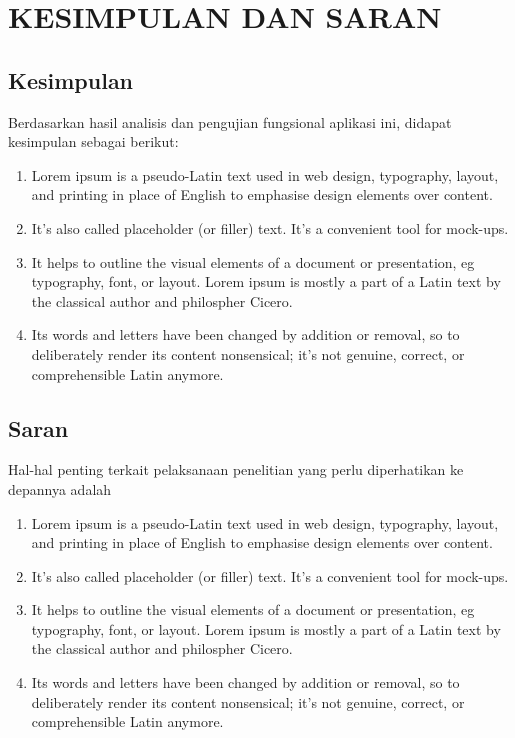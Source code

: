 \chapter{KESIMPULAN DAN SARAN}

\section{Kesimpulan}
Berdasarkan hasil analisis dan pengujian fungsional aplikasi ini, didapat kesimpulan sebagai berikut:

\begin{enumerate}
	\item Lorem ipsum is a pseudo-Latin text used in web design, typography, layout, and printing in place of English to emphasise design elements over content.

	\item It's also called placeholder (or filler) text. It's a convenient tool for mock-ups.

	\item It helps to outline the visual elements of a document or presentation, eg typography, font, or layout. Lorem ipsum is mostly a part of a Latin text by the classical author and philospher Cicero.

	\item Its words and letters have been changed by addition or removal, so to deliberately render its content nonsensical; it's not genuine, correct, or comprehensible Latin anymore.
\end{enumerate}


\section{Saran}
Hal-hal penting terkait pelaksanaan penelitian yang perlu diperhatikan ke depannya adalah
\begin{enumerate}
	\item Lorem ipsum is a pseudo-Latin text used in web design, typography, layout, and printing in place of English to emphasise design elements over content.

	\item It's also called placeholder (or filler) text. It's a convenient tool for mock-ups.

	\item It helps to outline the visual elements of a document or presentation, eg typography, font, or layout. Lorem ipsum is mostly a part of a Latin text by the classical author and philospher Cicero.

	\item Its words and letters have been changed by addition or removal, so to deliberately render its content nonsensical; it's not genuine, correct, or comprehensible Latin anymore.
\end{enumerate}


\begin{comment}

\end{comment}

